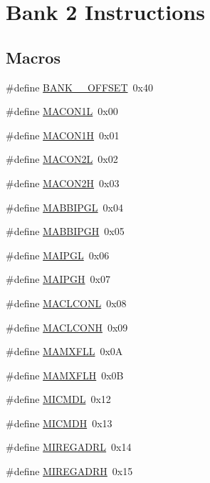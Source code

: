 \hypertarget{group___b_a_n_k__2}{}\section{Bank 2 Instructions}
\label{group___b_a_n_k__2}
\subsection*{Macros}
\begin{DoxyCompactItemize}
\item 
\#define \mbox{\hyperlink{group___b_a_n_k__2_ga8b7a13bb9d4e800d9780f7dd7e1fb7a1}{B\+A\+N\+K\+\_\+\_\+\+O\+F\+F\+S\+ET}}~0x40
\item 
\#define \mbox{\hyperlink{group___b_a_n_k__2_gad09cf5da7c231105647ce1517e84c8e4}{M\+A\+C\+O\+N1L}}~0x00
\item 
\#define \mbox{\hyperlink{group___b_a_n_k__2_ga20848344112453363ed66ad305cbd893}{M\+A\+C\+O\+N1H}}~0x01
\item 
\#define \mbox{\hyperlink{group___b_a_n_k__2_gac7fd265109ecf38db515527c27ac5f79}{M\+A\+C\+O\+N2L}}~0x02
\item 
\#define \mbox{\hyperlink{group___b_a_n_k__2_ga9cd3eda04d66d14fe8f8fe46b260e81d}{M\+A\+C\+O\+N2H}}~0x03
\item 
\#define \mbox{\hyperlink{group___b_a_n_k__2_gacd7ea416b65b2a84378dfea8bacfd24c}{M\+A\+B\+B\+I\+P\+GL}}~0x04
\item 
\#define \mbox{\hyperlink{group___b_a_n_k__2_gac586d61570587d6895a16395cb22b19f}{M\+A\+B\+B\+I\+P\+GH}}~0x05
\item 
\#define \mbox{\hyperlink{group___b_a_n_k__2_ga8daa7f7ef529828ef4cc3d90a48ff730}{M\+A\+I\+P\+GL}}~0x06
\item 
\#define \mbox{\hyperlink{group___b_a_n_k__2_ga70b21ea01d623429bf3bd1abf583c80f}{M\+A\+I\+P\+GH}}~0x07
\item 
\#define \mbox{\hyperlink{group___b_a_n_k__2_ga893638fe965fe9e57012c352fc56c557}{M\+A\+C\+L\+C\+O\+NL}}~0x08
\item 
\#define \mbox{\hyperlink{group___b_a_n_k__2_ga13a6b63ac9ee2cb3a02302237438e482}{M\+A\+C\+L\+C\+O\+NH}}~0x09
\item 
\#define \mbox{\hyperlink{group___b_a_n_k__2_ga4ed708903a040c0ea4fc071707863ffc}{M\+A\+M\+X\+F\+LL}}~0x0A
\item 
\#define \mbox{\hyperlink{group___b_a_n_k__2_ga294e961d04adc72cbc8b866bb6506e8d}{M\+A\+M\+X\+F\+LH}}~0x0B
\item 
\#define \mbox{\hyperlink{group___b_a_n_k__2_ga509e8391022b6630135ab9534e0918d0}{M\+I\+C\+M\+DL}}~0x12
\item 
\#define \mbox{\hyperlink{group___b_a_n_k__2_gadcba215d13a5bc53ff98109e09846d5b}{M\+I\+C\+M\+DH}}~0x13
\item 
\#define \mbox{\hyperlink{group___b_a_n_k__2_gab7e269d9cd345fba4571b811387be4ce}{M\+I\+R\+E\+G\+A\+D\+RL}}~0x14
\item 
\#define \mbox{\hyperlink{group___b_a_n_k__2_gabc0b2bdf0487165652d5824e514702cf}{M\+I\+R\+E\+G\+A\+D\+RH}}~0x15
\end{DoxyCompactItemize}


